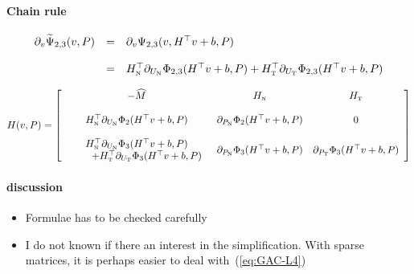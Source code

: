\paragraph{Chain rule}
\begin{equation}
  \label{eq:chainrule1}
  \begin{array}{lcl}
  \partial_v \widetilde \Psi_{2,3}(v,P) &=&  \partial_v \Psi_{2,3}(v,H^\top v +b,P)  \\ \\
  &=& H_{{\hbox{\tiny{N}}}}^\top \partial_{U_{\hbox{\tiny{N}}}} \Phi_{2,3}(H^\top v + b,P) + H_{{\hbox{\tiny{T}}}}^\top \partial_{U_{\hbox{\tiny{T}}}} \Phi_{2,3}(H^\top v + b,P)  
\end{array}
\end{equation}

\begin{equation}
  \label{eq:GAC-L6}
   H(v,P) = 
   \left[\begin{array}{ccc}
       - \widehat M &   H_{{\hbox{\tiny{N}}}} & H_{{\hbox{\tiny{T}}}} \\ \\
       H_{{\hbox{\tiny{N}}}}^\top \partial_{U_{\hbox{\tiny{N}}}} \Phi_{2}(H^\top v + b,P) &   \partial_{P_{{\hbox{\tiny{N}}}}} \Phi_2(H^\top v + b,P) & 0 \\ \\
       \begin{array}{c}
         H_{{\hbox{\tiny{N}}}}^\top \partial_{U_{\hbox{\tiny{N}}}} \Phi_{3}(H^\top v + b,P) \\
         \quad \quad + H_{{\hbox{\tiny{T}}}}^\top \partial_{U_{\hbox{\tiny{T}}}} \Phi_{3}(H^\top v + b,P)\\
     \end{array}
     &  \partial_{P_{{\hbox{\tiny{N}}}}} \Phi_3(H^\top v + b,P)  & \partial_{P_{{\hbox{\tiny{T}}}}} \Phi_3(H^\top v + b,P)
   \end{array}\right]
\end{equation}

\paragraph{discussion}
\begin{itemize}
\item Formulae has to be checked carefully
\item I do not known if there an interest in the simplification. With sparse matrices, it is perhaps easier to deal with~(\ref{eq:GAC-L4})
\end{itemize}



